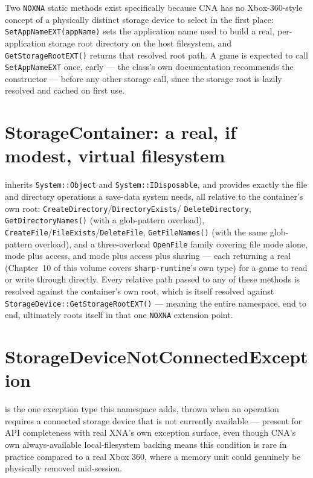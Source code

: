 Two \texttt{NOXNA} static methods exist specifically because CNA has no Xbox-360-style
concept of a physically distinct storage device to select in the first place:
\texttt{SetAppNameEXT(appName)} sets the application name used to build a real,
per-application storage root directory on the host filesystem, and
\texttt{GetStorageRootEXT()} returns that resolved root path. A game is expected to call
\texttt{SetAppNameEXT} once, early --- the class's own documentation recommends the
 constructor --- before any other storage call, since the storage root is
lazily resolved and cached on first use.

\section{StorageContainer: a real, if modest, virtual filesystem}

 inherits \texttt{System::Object} and \texttt{System::IDisposable},
and provides exactly the file and directory operations a save-data system needs, all relative
to the container's own root: \texttt{CreateDirectory}/\texttt{DirectoryExists}/%
\texttt{DeleteDirectory}, \texttt{GetDirectoryNames()} (with a glob-pattern overload),
\texttt{CreateFile}/\texttt{FileExists}/\texttt{DeleteFile}, \texttt{GetFileNames()} (with the
same glob-pattern overload), and a three-overload \texttt{OpenFile} family covering file mode
alone, mode plus access, and mode plus access plus sharing --- each returning a real
 (Chapter~10 of this volume covers \texttt{sharp-runtime}'s own
 type) for a game to read or write through directly. Every relative path
passed to any of these methods is resolved against the container's own root, which is itself
resolved against \texttt{StorageDevice::GetStorageRootEXT()} --- meaning the entire
namespace, end to end, ultimately roots itself in that one \texttt{NOXNA} extension point.

\section{StorageDeviceNotConnectedException}

 is the one exception type this namespace adds,
thrown when an operation requires a connected storage device that is not currently available
--- present for API completeness with real XNA's own exception surface, even though CNA's own
always-available local-filesystem backing means this condition is rare in practice compared
to a real Xbox 360, where a memory unit could genuinely be physically removed mid-session.

